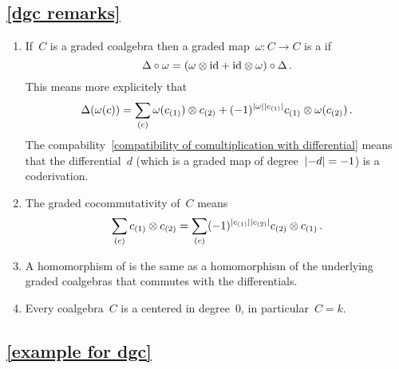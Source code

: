 




\subsection{\cref{dgc remarks}}
\label{dgc remarks proof}

\begin{enumerate}
  \item
    If~$C$ is a graded coalgebra then a graded map~$\omega \colon C \to C$ is a  if
    \[
      \Delta \circ \omega
      =
      (\omega \otimes {\operatorname{id}} + {\operatorname{id}} \otimes \omega) \circ \Delta \,.
    \]
    This means more explicitely that
    \[
      \Delta(\omega(c))
      =
      \sum_{(c)}
        \omega(c_{(1)}) \otimes c_{(2)}
      + (-1)^{\lvert\omega\rvert \lvert c_{(1)}\rvert} c_{(1)} \otimes \omega( c_{(2)} ) \,.
    \]
    The compability~\eqref{compatibility of comultiplication with differential} means that the differential~$d$ (which is a graded map of degree~$\lvert-d\rvert = -1$) is a coderivation.
  \item
    The graded cocommutativity of~$C$ means
    \[
      \sum_{(c)} c_{(1)} \otimes c_{(2)}
      =
      \sum_{(c)} (-1)^{\lvert c_{(1)}\rvert \lvert c_{(2)}\rvert} c_{(2)} \otimes c_{(1)} \,.
    \]
  \item
    A homomorphism of {\dgcs} is the same as a homomorphism of the underlying graded coalgebras that commutes with the differentials.
  \item
    Every coalgebra~$C$ is a {\dgc} centered in degree~$0$, in particular~$C = k$.
\end{enumerate}





\subsection{\cref{example for dgc}}
\label{example for dgc proof}

